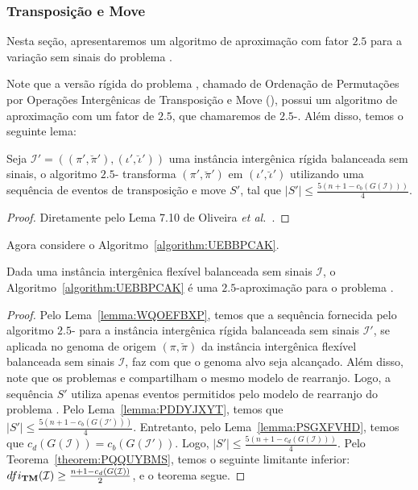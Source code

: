\subsubsection{Transposição e Move}

Nesta seção, apresentaremos um algoritmo de aproximação com fator $2.5$ para a variação sem sinais do problema \SbFITM{}. 

Note que a versão rígida do problema \SbFITM{}, chamado de Ordenação de Permutações por Operações Intergênicas de Transposição e Move (\SbITM), possui um algoritmo de aproximação com um fator de $2.5$, que chamaremos de $2.5$-\SbITM{}. Além disso, temos o seguinte lema:

\begin{lemma}\label{lemma:PDDYJXYT}
Seja $\mathcal{I}' = ((\pi',\breve\pi'),(\iota',\breve\iota'))$ uma instância intergênica rígida balanceada sem sinais, o algoritmo $2.5$-\SbITM{} transforma $(\pi',\breve\pi')$ em $(\iota',\breve\iota')$ utilizando uma sequência de eventos de transposição e move $S'$, tal que $|S'| \le \frac{5({n+1} - c_b(G(\mathcal{I})))}{4}$.
\end{lemma}
\begin{proof}
Diretamente pelo Lema 7.10 de Oliveira \textit{et al.}~\cite{2021a-oliveira-etal}.
\end{proof}

Agora considere o Algoritmo~\ref{algorithm:UEBBPCAK}.



\begin{theorem}\label{theorem:DWYTBIPX}
Dada uma instância intergênica flexível balanceada sem sinais $\mathcal{I}$, o Algoritmo~\ref{algorithm:UEBBPCAK} é uma $2.5$-aproximação para o problema \SbFIT{}.
\end{theorem}
\begin{proof}
Pelo Lema~\ref{lemma:WQOEFBXP}, temos que a sequência fornecida pelo algoritmo $2.5$-\SbIT{} para a instância intergênica rígida balanceada sem sinais $\mathcal{I'}$, se aplicada no genoma de origem $(\pi,\breve\pi)$ da instância intergênica flexível balanceada sem sinais $\mathcal{I}$, faz com que o genoma alvo seja alcançado. Além disso, note que os problemas \SbITM{} e \SbFITM{} compartilham o mesmo modelo de rearranjo. Logo, a sequência $S'$ utiliza apenas eventos permitidos pelo modelo de rearranjo do problema \SbFITM{}. Pelo Lema~\ref{lemma:PDDYJXYT}, temos que $|S'| \le \frac{5({n+1} - c_b(G(\mathcal{I}')))}{4}$. Entretanto, pelo Lema~\ref{lemma:PSGXFVHD}, temos que $c_d(G(\mathcal{I})) = c_b(G(\mathcal{I}'))$. Logo, $|S'| \le \frac{5({n+1} - c_d(G(\mathcal{I})))}{4}$. Pelo Teorema~\ref{theorem:PQQUYBMS}, temos o seguinte limitante inferior: $dfi_{\textbf{TM}}(\mathcal{I}) \ge \frac{{n+1} - c_d(G(\mathcal{I}))}{2}$, e o teorema segue.
\end{proof}

